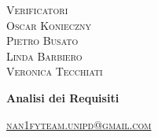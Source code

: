 \documentclass[8pt]{article}
\begin{document}
\begin{titlepage}
\begin{minipage}[t]{0.47\textwidth}
{		}
		\vspace{8mm}
		
		{\large{\textsc{Verificatori}}
			\vspace{3mm}
			{\\\large{\textsc{Oscar Konieczny}\\}} 
			{\large{\textsc{Pietro Busato}\\}}
			{\large{\textsc{Linda Barbiero}\\}}
   {\large{\textsc{Veronica Tecchiati}}}
			
		}
		\vspace{2mm}\vspace{2mm}
	\end{minipage}
	\vspace{4cm}
	\begin{center}
		\begin{flushright}
			{\fontsize{30pt}{52pt}\selectfont \textbf{Analisi dei Requisiti\\}} %
		\end{flushright}
		\vspace{3cm}
	\end{center}
	\vspace{8.5cm}
	{\small \textsc{\href{mailto: nan1fyteam.unipd@gmail.com}{\color{black}nan1fyteam.unipd@gmail.com}}}
\end{titlepage}
\pagestyle{mystyle}
\end{document}
